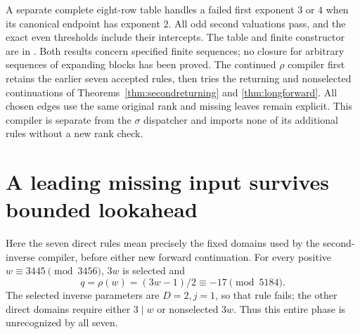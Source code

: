 \documentclass[11pt]{article}
\begin{document}
A separate complete eight-row table handles a failed first exponent
$3$ or $4$ when its canonical endpoint has exponent $2$. All odd second
valuations pass, and the exact even thresholds include their intercepts.
The table and finite constructor are in
.
Both results concern specified finite sequences; no closure for arbitrary
sequences of expanding blocks has been proved.
The continued $\rho$ compiler first retains the earlier seven accepted
rules, then tries the returning and nonselected continuations of
Theorems~\ref{thm:secondreturning} and \ref{thm:longforward}. All chosen
edges use the same original rank and missing leaves remain explicit.
This compiler is separate from the $\sigma$ dispatcher and imports none
of its additional rules without a new rank check.

\section{A leading missing input survives bounded lookahead}
Here the seven direct rules mean precisely the fixed domains used by
the second-inverse compiler, before either new forward continuation.
For every positive $w\equiv3445\pmod{3456}$, $3w$ is selected and
\[
 q=\rho(w)=(3w-1)/2\equiv-17\pmod{5184}.
\]
The selected inverse parameters are $D=2,j=1$, so that rule fails;
the other direct domains require either $3\mid w$ or nonselected $3w$.
Thus this entire phase is unrecognized by all seven.
\end{document}
